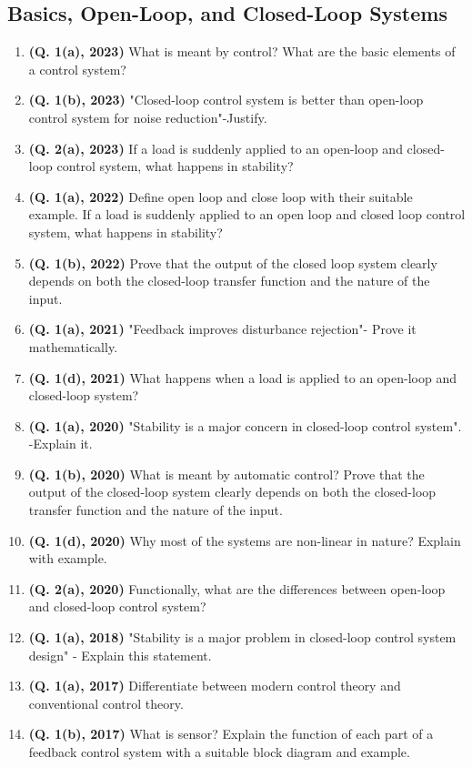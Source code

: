 \documentclass[12pt, a4paper]{article}
\begin{document}
	\subsection{Basics, Open-Loop, and Closed-Loop Systems}
	\begin{enumerate}
		\item \textbf{(Q. 1(a), 2023)} What is meant by control? What are the basic elements of a control system?
		\item \textbf{(Q. 1(b), 2023)} "Closed-loop control system is better than open-loop control system for noise reduction"-Justify.
		\item \textbf{(Q. 2(a), 2023)} If a load is suddenly applied to an open-loop and closed-loop control system, what happens in stability?
		\item \textbf{(Q. 1(a), 2022)} Define open loop and close loop with their suitable example. If a load is suddenly applied to an open loop and closed loop control system, what happens in stability?
		\item \textbf{(Q. 1(b), 2022)} Prove that the output of the closed loop system clearly depends on both the closed-loop transfer function and the nature of the input.
		\item \textbf{(Q. 1(a), 2021)} "Feedback improves disturbance rejection"- Prove it mathematically.
		\item \textbf{(Q. 1(d), 2021)} What happens when a load is applied to an open-loop and closed-loop system?
		\item \textbf{(Q. 1(a), 2020)} "Stability is a major concern in closed-loop control system". -Explain it.
		\item \textbf{(Q. 1(b), 2020)} What is meant by automatic control? Prove that the output of the closed-loop system clearly depends on both the closed-loop transfer function and the nature of the input.
		\item \textbf{(Q. 1(d), 2020)} Why most of the systems are non-linear in nature? Explain with example.
		\item \textbf{(Q. 2(a), 2020)} Functionally, what are the differences between open-loop and closed-loop control system?
		\item \textbf{(Q. 1(a), 2018)} "Stability is a major problem in closed-loop control system design" - Explain this statement.
		\item \textbf{(Q. 1(a), 2017)} Differentiate between modern control theory and conventional control theory.
		\item \textbf{(Q. 1(b), 2017)} What is sensor? Explain the function of each part of a feedback control system with a suitable block diagram and example.

\end{enumerate}
\end{document}
